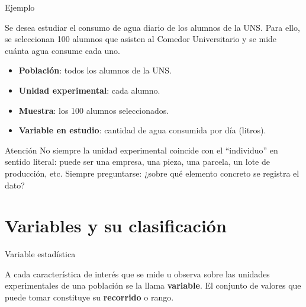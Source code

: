 \documentclass[aspectratio=169,11pt]{beamer}
\begin{document}
\begin{frame}{Ejemplo}
\begin{example}
Se desea estudiar el consumo de agua diario de los alumnos de la UNS. Para ello, se seleccionan 100 alumnos que asisten al Comedor Universitario y se mide cuánta agua consume cada uno.
\begin{itemize}
\item \textbf{Población}: todos los alumnos de la UNS.
\item \textbf{Unidad experimental}: cada alumno.
\item \textbf{Muestra}: los 100 alumnos seleccionados.
\item \textbf{Variable en estudio}: cantidad de agua consumida por día (litros).
\end{itemize}
\end{example}
\begin{alertblock}{Atención}
No siempre la unidad experimental coincide con el ``individuo'' en sentido literal: puede ser una empresa, una pieza, una parcela, un lote de producción, etc. Siempre preguntarse: ¿sobre qué elemento concreto se registra el dato?
\end{alertblock}
\end{frame}

\section{Variables y su clasificación}

\begin{frame}{Variable estadística}
\begin{definition}
A cada característica de interés que se mide u observa sobre las unidades experimentales de una población se la llama \textbf{variable}. El conjunto de valores que puede tomar constituye su \textbf{recorrido} o rango.
\end{definition}
\vspace{0.3cm}
\centering
{}
\end{frame}
\end{document}
